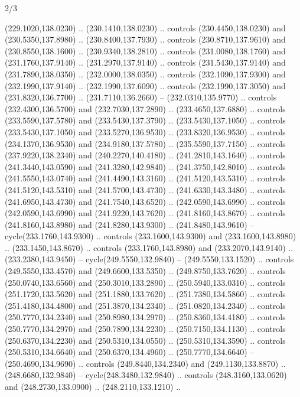 \begin{flagdescription}{2/3}
\begin{scope}[xshift=0.5\flaglength,yshift=0.5\flagwidth,scale=\flagwidth/259.2]
\begin{scope}[y=0.8pt, x=0.8pt, yscale=-1,shift={(-243,-162)}]
      (229.1020,138.0230) .. (230.1410,138.0230) .. controls (230.4450,138.0230) and
      (230.5350,137.8980) .. (230.8400,137.7930) .. controls (230.8710,137.9610) and
      (230.8550,138.1600) .. (230.9340,138.2810) .. controls (231.0080,138.1760) and
      (231.1760,137.9140) .. (231.2970,137.9140) .. controls (231.5430,137.9140) and
      (231.7890,138.0350) .. (232.0000,138.0350) .. controls (232.1090,137.9300) and
      (232.1990,137.9140) .. (232.1990,137.6090) .. controls (232.1990,137.3050) and
      (231.8320,136.7700) .. (231.7110,136.2660) -- (232.0310,135.9770) .. controls
      (232.4300,136.5700) and (232.7030,137.2890) .. (233.4650,137.6880) .. controls
      (233.5590,137.5780) and (233.5430,137.3790) .. (233.5430,137.1050) .. controls
      (233.5430,137.1050) and (233.5270,136.9530) .. (233.8320,136.9530) .. controls
      (234.1370,136.9530) and (234.9180,137.5780) .. (235.5590,137.7150) .. controls
      (237.9220,138.2340) and (240.2270,140.4180) .. (241.2810,143.1640) .. controls
      (241.3440,143.0590) and (241.3280,142.9840) .. (241.3750,142.8010) .. controls
      (241.5550,143.0740) and (241.4490,143.3160) .. (241.5120,143.5310) .. controls
      (241.5120,143.5310) and (241.5700,143.4730) .. (241.6330,143.3480) .. controls
      (241.6950,143.4730) and (241.7540,143.6520) .. (242.0590,143.6990) .. controls
      (242.0590,143.6990) and (241.9220,143.7620) .. (241.8160,143.8670) .. controls
      (241.8160,143.8980) and (241.8280,143.9300) .. (241.8480,143.9610) --
      cycle(233.1760,143.9300) .. controls (233.1600,143.9300) and
      (233.1600,143.8980) .. (233.1450,143.8670) .. controls (233.1760,143.8980) and
      (233.2070,143.9140) .. (233.2380,143.9450) -- cycle(249.5550,132.9840) --
      (249.5550,133.1520) .. controls (249.5550,133.4570) and (249.6600,133.5350) ..
      (249.8750,133.7620) .. controls (250.0740,133.6560) and (250.3010,133.2890) ..
      (250.5940,133.0310) .. controls (251.1720,133.5620) and (251.1880,133.7620) ..
      (251.7380,134.5860) .. controls (251.4180,134.4800) and (251.3870,134.2340) ..
      (251.0820,134.2340) .. controls (250.7770,134.2340) and (250.8980,134.2970) ..
      (250.8360,134.4180) .. controls (250.7770,134.2970) and (250.7890,134.2230) ..
      (250.7150,134.1130) .. controls (250.6370,134.2230) and (250.5310,134.0550) ..
      (250.5310,134.3590) .. controls (250.5310,134.6640) and (250.6370,134.4960) ..
      (250.7770,134.6640) -- (250.4690,134.9690) .. controls (249.8440,134.2340) and
      (249.1130,133.8870) .. (248.6680,132.9840) -- cycle(248.3480,132.9840) ..
      controls (248.3160,133.0620) and (248.2730,133.0900) .. (248.2110,133.1210) ..

\end{scope}
\end{scope}
\end{flagdescription}
